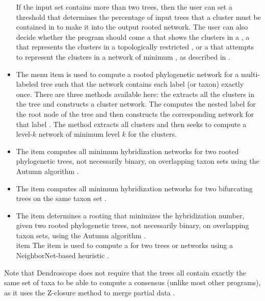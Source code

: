 \documentclass[11pt]{article}
\newcommand{\cs}[1]{\textcolor{red}{#1}}
\begin{document}
\begin{itemize}
If the input set contains more than two trees, then the user can set a 
threshold that determines the percentage of input trees that a cluster must be 
contained in to make it into the output rooted network.
The user can also 
decide whether the program should come a  
\cite{ClusterNetworks2008} that shows the clusters in a
, a
 \cite{GalledNetworks2009} that represents the clusters in a 
topologically restricted ,
or a  that attempts to represent the
clusters in a network of minimum ,
as described in \cite{LevelKClusters2010}.
\item
The  menu item is used to compute a rooted
phylogenetic network for a multi-labeled tree such that the network contains each label (or taxon)
exactly once. There are three methods available here: the 
extracts all the clusters in the tree and constructs a cluster network.
The  computes the nested label for the root node of the tree and
then constructs the corresponding network for that label \cite{HOLM2007}.
The  method extracts all clusters and then seeks to compute a level-$k$ network
of minimum level $k$ for the clusters.
\item The  item computes all minimum {hybridization networks} for two rooted
phylogenetic trees, not necessarily binary, on overlapping taxon sets using the Autumn algorithm \cite{HusonLinz2012}.
\item The  item computes all minimum {hybridization networks} for two bifurcating trees on the same taxon set  \cite{Albrecht2012}.
\item The  item determines a rooting that minimizes the
hybridization number, given two rooted
phylogenetic trees, not necessarily binary, on overlapping taxon sets, using the Autumn algorithm \cite{HusonLinz2012}.
\\item The  item is used to compute a  for two trees or networks using a NeighborNet-based heuristic \cite{Tanglegrams}.
\end{itemize}

Note that  Dendroscope does not require that the trees all contain exactly the same set of taxa to be able
to compute a consensus (unlike most other programs), as it uses
the Z-closure method to merge partial data \cite{zclosure}.%
\end{document}
